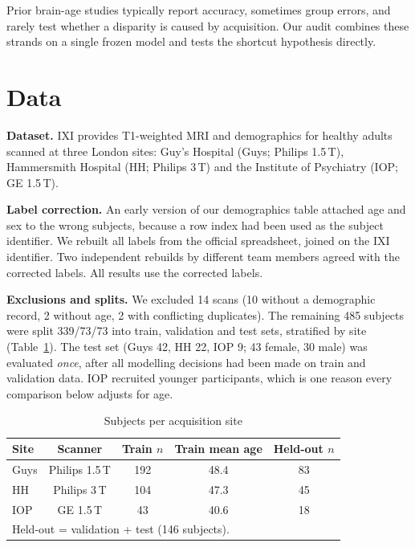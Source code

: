 \documentclass[conference]{IEEEtran}
\begin{document}
Prior brain-age studies typically report accuracy, sometimes group errors, and rarely test whether a disparity is caused by acquisition. Our audit combines these strands on a single frozen model and tests the shortcut hypothesis directly.

\section{Data}
\textbf{Dataset.} IXI \cite{ixi} provides T1-weighted MRI and demographics for healthy adults scanned at three London sites: Guy's Hospital (Guys; Philips 1.5\,T), Hammersmith Hospital (HH; Philips 3\,T) and the Institute of Psychiatry (IOP; GE 1.5\,T).

\textbf{Label correction.} An early version of our demographics table attached age and sex to the wrong subjects, because a row index had been used as the subject identifier. We rebuilt all labels from the official spreadsheet, joined on the IXI identifier. Two independent rebuilds by different team members agreed with the corrected labels. All results use the corrected labels.

\textbf{Exclusions and splits.} We excluded 14 scans (10 without a demographic record, 2 without age, 2 with conflicting duplicates). The remaining 485 subjects were split 339/73/73 into train, validation and test sets, stratified by site (Table~\ref{tab:data}). The test set (Guys 42, HH 22, IOP 9; 43 female, 30 male) was evaluated \emph{once}, after all modelling decisions had been made on train and validation data. IOP recruited younger participants, which is one reason every comparison below adjusts for age.

\begin{table}[t]
\caption{Subjects per acquisition site}
\label{tab:data}
\centering
\begin{tabular}{lcccc}
\toprule
Site & Scanner & Train $n$ & Train mean age & Held-out $n$ \\
\midrule
Guys & Philips 1.5\,T & 192 & 48.4 & 83 \\
HH   & Philips 3\,T   & 104 & 47.3 & 45 \\
IOP  & GE 1.5\,T      & 43  & 40.6 & 18 \\
\bottomrule
\multicolumn{5}{l}{\footnotesize Held-out = validation + test (146 subjects).}
\end{tabular}
\end{table}
\end{document}
